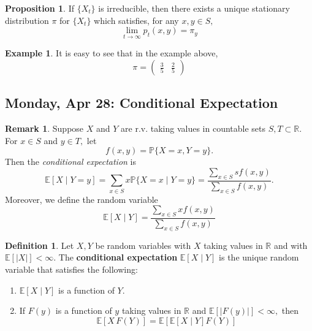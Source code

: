\documentclass[10pt, oneside]{article}
\newcommand{\bbR}{\mathbb{R}}
\newcommand{\bbP}{\mathbb{P}}
\newcommand{\bbE}{\mathbb{E}}
\theoremstyle{definition}
\newtheorem{exmp}{Example}[section]
\newtheorem{defn}{Definition}
\newtheorem{prop}{Proposition}
\newtheorem{rem}{Remark}
\begin{document}
\begin{prop}
    If $\{X_t\}$ is irreducible, then there exists a unique stationary distribution $\pi$ for $\{X_t\}$ which satisfies, for any $x,y \in S,$
    \[\lim_{t\to \infty} p_t(x,y) = \pi_y\]
\end{prop}
\begin{exmp}
    It is easy to see that in the example above, 
    \[\pi = \begin{pmatrix}
        \frac{3}{5} & \frac{2}{5}
    \end{pmatrix}\]
\end{exmp}

\newpage
\subsection{Monday, Apr 28: Conditional Expectation}

\begin{rem}
    Suppose $X$ and $Y$ are r.v. taking values in countable sets $S,T \subset \bbR.$ For $x \in S$ and $y \in T,$ let 
    \[f(x,y) = \bbP\{X = x, Y = y\}.\] Then the \textit{conditional expectation} is 
    \[\bbE[X \mid Y = y] = \sum_{x \in S}x \bbP\{X = x \mid Y = y\} = \frac{\displaystyle\sum_{x\in S}s f(x,y)}{\displaystyle\sum_{x\in S}f(x,y)}.\] Moreover, we define the random variable
    \[\bbE[X \mid Y] = \frac{\displaystyle\sum_{x \in S} xf(x,y)}{\displaystyle\sum_{x\in S}f(x,y)}\]
\end{rem}

\begin{defn}
    Let $X,Y$ be random variables with $X$ taking values in $\bbR$ and with $\bbE[ | X|] < \infty.$ The \textbf{conditional expectation} $\bbE[X \mid Y]$ is the unique random variable  that satisfies the following:
    \begin{enumerate}
        \item $\bbE[X \mid Y]$ is a function of $Y.$
        \item If $F(y)$ is a function of $y$ taking values in $\bbR$ and $\bbE[ |F(y) | ] < \infty,$ then 
        \[\bbE[X \, F(Y)] = \bbE[\bbE[X \mid Y]  F(Y)]\]
    \end{enumerate}
\end{defn}
\end{document}
